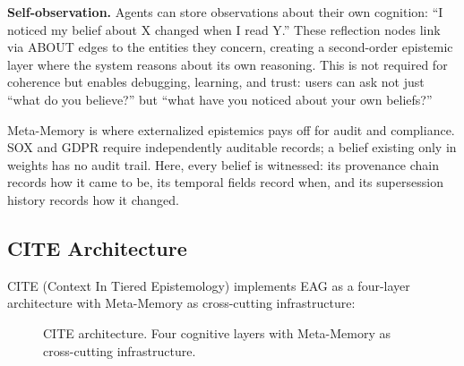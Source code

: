 \documentclass[11pt,letterpaper]{article}
\begin{document}
\textbf{Self-observation.} Agents can store observations about their own cognition: ``I noticed my belief about X changed when I read Y.'' These reflection nodes link via ABOUT edges to the entities they concern, creating a second-order epistemic layer where the system reasons about its own reasoning. This is not required for coherence but enables debugging, learning, and trust: users can ask not just ``what do you believe?'' but ``what have you noticed about your own beliefs?''

Meta-Memory is where externalized epistemics pays off for audit and compliance. SOX and GDPR require independently auditable records; a belief existing only in weights has no audit trail. Here, every belief is witnessed: its provenance chain records how it came to be, its temporal fields record when, and its supersession history records how it changed.

\subsection{CITE Architecture}

CITE (Context In Tiered Epistemology) implements EAG as a four-layer architecture with Meta-Memory as cross-cutting infrastructure:

\begin{figure}[H]
\centering
{}
\caption{CITE architecture. Four cognitive layers with Meta-Memory as cross-cutting infrastructure.}
\label{fig:layers}
\end{figure}
\end{document}
